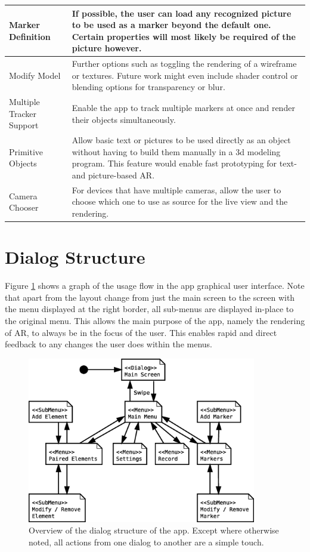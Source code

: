 \begin{tabulary}{\textwidth}{L || L}
Marker Definition & If possible, the user can load any recognized picture to be used as a marker beyond the default one. Certain properties will most likely be required of the picture however. \\
\hline
Modify Model & Further options such as toggling the rendering of a wireframe or textures. Future work might even include shader control or blending options for transparency or blur.\\
\hline
Multiple Tracker Support & Enable the app to track multiple markers at once and render their objects simultaneously.\\
\hline
Primitive Objects & Allow basic text or pictures to be used directly as an object without having to build them manually in a 3d modeling program. This feature would enable fast prototyping for text- and picture-based AR.\\
\hline
Camera Chooser & For devices that have multiple cameras, allow the user to choose which one to use as source for the live view and the rendering.\\
\end{tabulary}

\section{Dialog Structure}

Figure \ref{fig:dialog_structure} shows a graph of the usage flow in the app graphical user interface.
Note that apart from the layout change from just the main screen to the screen with the menu displayed at the right border, all sub-menus are displayed in-place to the original menu.
This allows the main purpose of the app, namely the rendering of AR, to always be in the focus of the user.
This enables rapid and direct feedback to any changes the user does within the menus.

\begin{figure}
	\centering
	\includegraphics[width=10cm]{img/dialogs.eps}
	\caption[App Dialog Structure.]{Overview of the dialog structure of the app. Except where otherwise noted, all actions from one dialog to another are a simple touch.}
	\label{fig:dialog_structure}
\end{figure}

